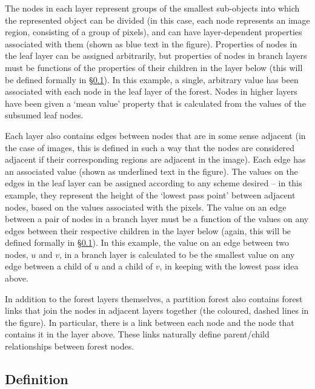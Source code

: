 The nodes in each layer represent groups of the smallest sub-objects into which the represented object can be divided (in this case, each node represents an image region, consisting of a group of pixels), and can have layer-dependent properties associated with them (shown as blue text in the figure). Properties of nodes in the leaf layer can be assigned arbitrarily, but properties of nodes in branch layers must be functions of the properties of their children in the layer below (this will be defined formally in \S\ref{sec:ipfs-definition}). In this example, a single, arbitrary value has been associated with each node in the leaf layer of the forest. Nodes in higher layers have been given a `mean value' property that is calculated from the values of the subsumed leaf nodes.

Each layer also contains edges between nodes that are in some sense adjacent (in the case of images, this is defined in such a way that the nodes are considered adjacent if their corresponding regions are adjacent in the image). Each edge has an associated value (shown as underlined text in the figure). The values on the edges in the leaf layer can be assigned according to any scheme desired -- in this example, they represent the height of the `lowest pass point' between adjacent nodes, based on the values associated with the pixels. The value on an edge between a pair of nodes in a branch layer must be a function of the values on any edges between their respective children in the layer below (again, this will be defined formally in \S\ref{sec:ipfs-definition}). In this example, the value on an edge between two nodes, $u$ and $v$, in a branch layer is calculated to be the smallest value on any edge between a child of $u$ and a child of $v$, in keeping with the lowest pass idea above.

In addition to the forest layers themselves, a partition forest also contains forest links that join the nodes in adjacent layers together (the coloured, dashed lines in the figure). In particular, there is a link between each node and the node that contains it in the layer above. These links naturally define parent/child relationships between forest nodes.


\subsection{Definition}
\label{sec:ipfs-definition}

